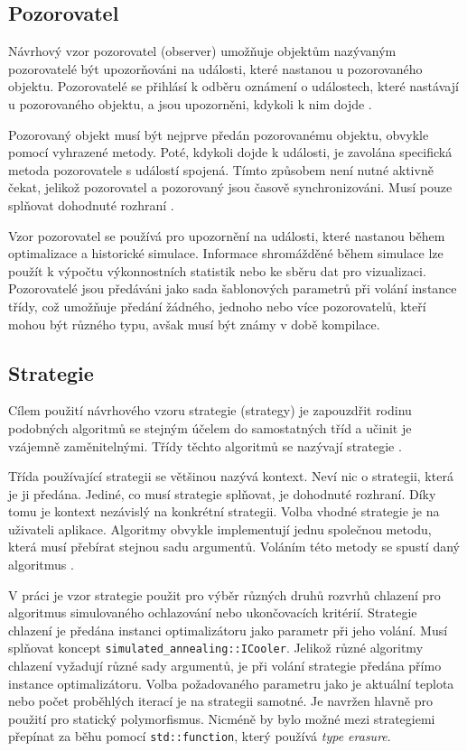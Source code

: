 \subsection{Pozorovatel}
Návrhový vzor pozorovatel (observer) umožňuje objektům nazývaným pozorovatelé být upozorňováni na události, které nastanou u pozorovaného objektu.
Pozorovatelé se přihlásí k odběru oznámení o událostech, které nastávají u pozorovaného objektu, a jsou upozorněni, kdykoli k nim dojde \cite{observer}.

Pozorovaný objekt musí být nejprve předán pozorovanému objektu, obvykle pomocí vyhrazené metody.
Poté, kdykoli dojde k události, je zavolána specifická metoda pozorovatele s událostí spojená.
Tímto způsobem není nutné aktivně čekat, jelikož pozorovatel a pozorovaný jsou časově synchronizováni.
Musí pouze splňovat dohodnuté rozhraní \cite{observer}.

Vzor pozorovatel se používá pro upozornění na události, které nastanou během optimalizace a historické simulace.
Informace shromážděné během simulace lze použít k výpočtu výkonnostních statistik nebo ke sběru dat pro vizualizaci.
Pozorovatelé jsou předáváni jako sada šablonových parametrů při volání instance třídy, což umožňuje předání žádného, jednoho nebo více pozorovatelů, kteří mohou být různého typu, avšak musí být známy v době kompilace.

\subsection{Strategie}
Cílem použití návrhového vzoru strategie (strategy) je zapouzdřit rodinu podobných algoritmů se stejným účelem do samostatných tříd a učinit je vzájemně zaměnitelnými.
Třídy těchto algoritmů se nazývají strategie \cite{strategy}.

Třída používající strategii se většinou nazývá kontext.
Neví nic o strategii, která je ji předána.
Jediné, co musí strategie splňovat, je dohodnuté rozhraní.
Díky tomu je kontext nezávislý na konkrétní strategii.
Volba vhodné strategie je na uživateli aplikace.
Algoritmy obvykle implementují jednu společnou metodu, která musí přebírat stejnou sadu argumentů.
Voláním této metody se spustí daný algoritmus \cite{strategy}.

V práci je vzor strategie použit pro výběr různých druhů rozvrhů chlazení pro algoritmus simulovaného ochlazování nebo ukončovacích kritérií.
Strategie chlazení je předána instanci optimalizátoru jako parametr při jeho volání.
Musí splňovat koncept \texttt{simulated\_annealing::ICooler}.
Jelikož různé algoritmy chlazení vyžadují různé sady argumentů, je při volání strategie předána přímo instance optimalizátoru.
Volba požadovaného parametru jako je aktuální teplota nebo počet proběhlých iterací je na strategii samotné.
Je navržen hlavně pro použití pro statický polymorfismus.
Nicméně by bylo možné mezi strategiemi přepínat za běhu pomocí \texttt{std::function}, který používá \textit{type erasure}.


